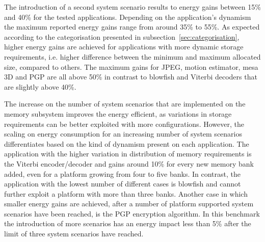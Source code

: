 \documentclass[a4paper,conference]{IEEEtran}
\begin{document}
The introduction of a second system scenario results to energy gains between 15\% and  40\%  for the tested applications. Depending on the application's dynamism the maximum reported energy gains range from around 35\% to 55\%. As expected according to the categorisation presented in subsection~\ref{sec:categorisation}, higher energy gains are achieved for applications with more dynamic storage requirements, i.e. higher difference between the minimum and maximum allocated size, compared to others. The maximum gains for JPEG, motion estimator, mesa 3D and PGP are all above 50\% in contrast to blowfish and Viterbi decoders that are slightly above 40\%.

The increase on the number of system scenarios that are implemented on the memory subsystem improves the energy efficient, as variations in storage requirements can be better exploited with more configurations. However, the scaling on energy consumption for an increasing number of system scenarios differentiates based on the kind of dynamism present on each application. The application with the higher variation in distribution of memory requirements is the Viterbi encoder/decoder and gains around 10\% for every new memory bank added, even for a platform growing from four to five banks. In contrast, the application with the lowest number of different cases is blowfish and cannot further exploit a platform with more than three banks. Another case in which smaller energy gains are achieved, after a number of platform supported system scenarios have been reached, is the PGP encryption algorithm. In this benchmark the introduction of more scenarios has an energy impact less than 5\% after the limit of three system scenarios have reached.
\end{document}
